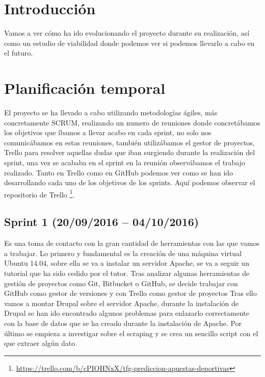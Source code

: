
\section{Introducción}

Vamos a ver cómo ha ido evolucionando el proyecto durante su realización, así como un estudio de viabilidad donde podemos ver si podemos llevarlo a cabo en el futuro.

\section{Planificación temporal}
El proyecto se ha llevado a cabo utilizando metodologías ágiles, más concretamente SCRUM, realizando un numero de reuniones donde concretábamos los objetivos que íbamos a llevar acabo en cada sprint, no solo nos comunicábamos en estas reuniones, también utilizábamos el gestor de proyectos, Trello para resolver aquellas dudas que iban surgiendo durante la realización del sprint, una vez se acababa en el sprint en la reunión observábamos el trabajo realizado. Tanto en Trello como en GitHub podemos ver como se han ido desarrollando cada uno de los objetivos de los sprints. Aquí podemos observar el repositorio de Trello \footnote{\url{https://trello.com/b/cPIOHNxX/tfg-prediccion-apuestas-deportivas}}.

\subsection{Sprint 1 (20/09/2016 – 04/10/2016)}
Es una toma de contacto con la gran cantidad de herramientas con las que vamos a trabajar. Lo primero y fundamental es la creación de una máquina virtual Ubuntu 14.04, sobre ella se va a instalar un servidor Apache, se va a seguir un tutorial que ha sido cedido por el tutor.
Tras analizar algunas herramientas de gestión de proyectos como Git, Bitbucket o GitHub, se decide trabajar con GitHub como gestor de versiones y con Trello como gestor de proyectos
Tras ello vamos a montar Drupal sobre el servidor Apache, durante la instalación de Drupal se han ido encontrado algunos problemas para enlazarlo correctamente con la base de datos que se ha creado durante la instalación de Apache.
Por último se empieza a investigar sobre el scraping y se crea un sencillo script con el que extraer algún dato.

